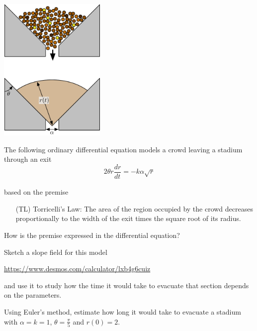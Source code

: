 \documentclass{workbook}
\begin{document}
\begin{slide}

\question

\begin{center}
	\includegraphics[width=145pt]{images/stadium.pdf}
\end{center}

	The following ordinary differential equation models a crowd leaving a stadium through an exit
	\[
	2 \theta r \frac{dr}{dt_{}} = - k \alpha \sqrt{r}
	\]
	
\begin{slidesonly}
	\bigskip
\end{slidesonly}

	
	based on the premise \\[-20pt]
	\begin{itemize}
		\item[(TL)]	Torricelli's Law: The area of the region occupied by the crowd decreases proportionally to the width of the exit times the square root of its radius. %
	\end{itemize}

	\begin{parts}
		\item How is the premise expressed in the differential equation?
		\item Sketch a slope field for this model

			\url{https://www.desmos.com/calculator/lxb4g6cuiz}

		and use it to study how the time it would take to evacuate that section depends on the parameters.
		
		\item Using Euler's method, estimate how long it would take to evacuate a stadium with $\alpha=k=1$, $\theta=\frac{\pi}{5}$ and $r(0)=2$.
		
\end{parts}

\end{slide}
\end{document}
